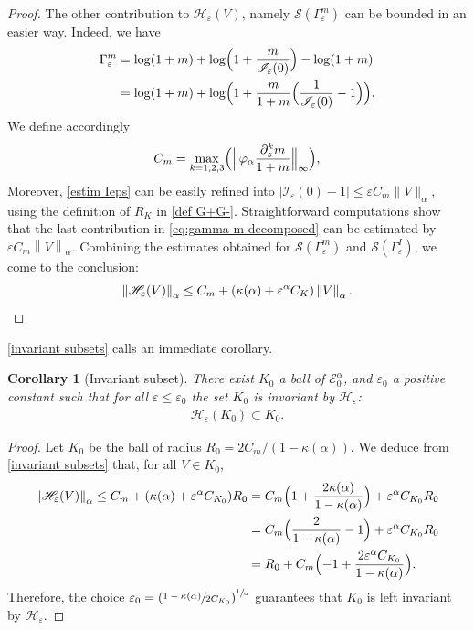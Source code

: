 \documentclass[10pt]{amsart}
\let\mathcal\mathscr
\newcommand{\cI}{\mathcal{I}}
\newcommand{\cS}{\mathcal{S}}
\theoremstyle{plain}
\newtheorem{cor}[thm]{Corollary}
\theoremstyle{definition}
\renewcommand{\H}{\mathcal{H}_\eps}
\let\eps\varepsilon
\newcommand{\nalph}[1]{\left\lVert#1\right\rVert_\alpha}
\newcommand{\Eaz}{\mathcal{E}^\alpha_0}
\newcommand{\Gammam}{\Gamma^m_{\eps}}
\newcommand{\GammaI}{\Gamma^I_{\eps}}
\newcommand{\vphia}{\varphi_\alpha}
\begin{document}
\begin{proof}
The other contribution to $\H(V)$, namely $\cS(\Gammam)$ can be bounded in an easier way. Indeed, we have
\begin{equation}\label{eq:gamma m decomposed}
\begin{split}
\Gammam &= \log(1 + m) + \log \Bigl(1 + \dfrac{m}{\cI_\eps(0)} \Bigr) - \log(1 + m)\\
&= \log(1 + m) + \log \Bigl(1 + \dfrac{m}{1 + m} \Bigl (\dfrac1{\cI_\eps(0)} - 1 \Bigr) \Bigr).
\end{split}
\end{equation}
We define accordingly
\begin{equation*}
C_m = \max_{k = 1,2,3} \Bigl (\Bigl \|\vphia \dfrac{\partial_z^{k} m}{1 + m} \Bigl \|_{\infty} \Bigl),
\end{equation*}
Moreover, \cref{estim Ieps} can be easily refined into $|\cI_\eps(0) - 1|\leq \eps C_m \|V\|_\alpha$, using the definition of $R_K$ in \eqref{def G+G-}. Straightforward computations show that the last contribution in \eqref{eq:gamma m decomposed} can be estimated by $\eps C_m \nalph{V}$. Combining the estimates obtained for $\cS(\Gammam)$ and $\cS(\GammaI)$, we come to the conclusion:
\[
\nalph{\H(V)} \leq C_m + (\kappa(\alpha) + \eps^\alpha C_K)\nalph{V}.\qedhere
\]
\end{proof}

\cref{invariant subsets} calls an immediate corollary.
\begin{cor}[Invariant subset]\label{cor invariant subset}
There exist $K_0$ a ball of $\Eaz$, and $\eps_0 $ a positive constant
such that for all $\eps \leq \eps_0$ the set $K_0$ is invariant by $\H$:
\begin{align*}
\H(K_0) \subset K_0.
\end{align*}
\end{cor}

\begin{proof}
Let $K_0$ be the ball of radius $R_0 = 2C_m/ (1 - \kappa(\alpha))$. We deduce from \cref{invariant subsets} that, for all $V\in K_0$,
\begin{align*}
\nalph{\H(V)} \leq C_m + (\kappa(\alpha) + \eps^\alpha C_{K_0})R_0 &= C_m \Bigl (1 + \dfrac{2\kappa(\alpha)}{1 - \kappa(\alpha)} \Bigr) + \eps^{\alpha} C_{K_0} R_0 \\
&= C_m \Bigl (\dfrac{2}{1 - \kappa(\alpha)} - 1 \Bigr) + \eps^{\alpha} C_{K_0} R_0 \\
& = R_0 + C_m \Bigl (-1 + \dfrac{2\eps^{\alpha} C_{K_0}}{1 - \kappa(\alpha)} \Bigr).
\end{align*}
Therefore, the choice
$\eps_0 = \left(\sfrac{1-\kappa(\alpha)}{2 C_{K_0}} \right)^{\sfrac1\alpha} $ guarantees that $K_0$ is left invariant by $\H$.
\end{proof}
\end{document}
